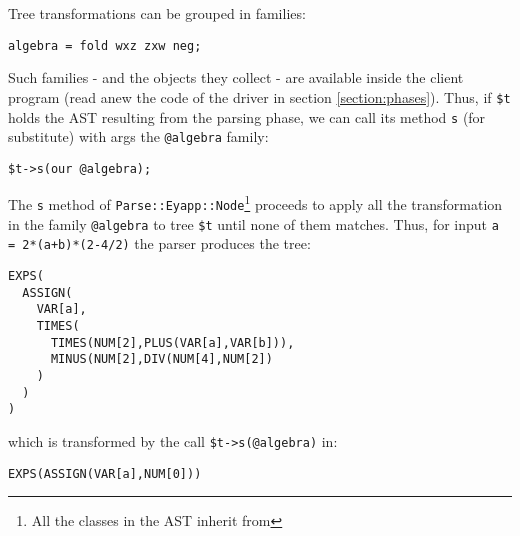 Tree transformations can be grouped in families:

\begin{verbatim}
algebra = fold wxz zxw neg;
\end{verbatim}

Such families - and the objects they collect - are 
available inside the client program (read anew the code
of the driver in section \ref{section:phases}). Thus,
if \verb|$t| holds the AST resulting
from the parsing phase, we can call
its method \verb|s| (for substitute)
with args the \verb|@algebra| family:
\begin{verbatim}
$t->s(our @algebra);
\end{verbatim}

The \verb|s| method of 
\verb|Parse::Eyapp::Node|\footnote{All the classes in the AST
inherit from }
proceeds to apply all the transformation in the family
\verb|@algebra| to tree \verb|$t|
until none of them matches. Thus, for input
\verb|a = 2*(a+b)*(2-4/2)| the parser
produces the tree:
\begin{verbatim}
EXPS(
  ASSIGN(
    VAR[a],
    TIMES(
      TIMES(NUM[2],PLUS(VAR[a],VAR[b])),
      MINUS(NUM[2],DIV(NUM[4],NUM[2])
    )
  )
)
\end{verbatim}
which is transformed by the call 
\verb|$t->s(@algebra)| in:
\begin{verbatim}
EXPS(ASSIGN(VAR[a],NUM[0]))
\end{verbatim}




